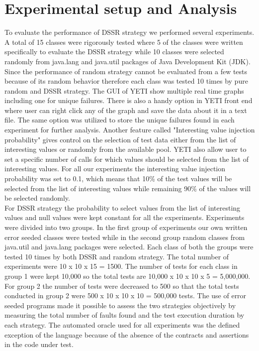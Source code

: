 
\section{Experimental setup and Analysis}

To evaluate the performance of DSSR strategy we performed several experiments. A total of 15 classes were rigorously tested where 5 of the classes were written specifically to evaluate the DSSR strategy while 10 classes were selected randomly from java.lang and java.util packages of Java Development Kit (JDK). Since the performance of random strategy cannot be evaluated from a few tests because of its random behavior therefore each class was tested 10 times by pure random and DSSR strategy. The GUI of YETI show multiple real time graphs including one for unique failures. There is also a handy option in YETI front end where user can right click any of the graph and save the data about it in a text file. The same option was utilized to store the unique failures found in each experiment for further analysis. Another feature called "Interesting value injection probability" gives control on the selection of test data either from the list of interesting values or randomly from the available pool. YETI also allow user to set a specific number of calls for which values should be selected from the list of interesting values. For all our experiments the interesting value injection probability was set to 0.1, which means that 10\% of the test values will be selected from the list of interesting values while remaining 90\% of the values will be selected randomly.\\

For DSSR strategy the probability to select values from the list of interesting values and null values were kept constant for all the experiments. Experiments were divided into two groups. In the first group of experiments our own written error seeded classes were tested while in the second group random classes from java.util and java.lang packages were selected. Each class of both the groups were tested 10 times by both DSSR and random strategy. The total number of experiments were 10 x 10 x 15 = 1500. The number of tests for each class in group 1 were kept 10,000 so the total tests are 10,000 x 10 x 10 x 5 = 5,000,000.  For group 2 the number of tests were decreased to 500 so that the total tests conducted in group 2 were 500 x 10 x 10 x 10 = 500,000 tests. The use of error seeded programs made it possible to assess the two strategies objectively by measuring the total number of faults found and the test execution duration by each strategy. The automated oracle used for all experiments was the defined exception of the language because of the absence of the contracts and assertions in the code under test.\\

